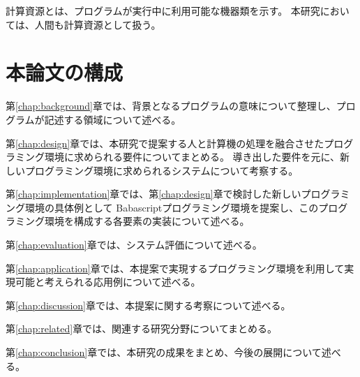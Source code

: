 計算資源とは、プログラムが実行中に利用可能な機器類を示す。
本研究においては、人間も計算資源として扱う。

\section{本論文の構成}\label{ux672cux8ad6ux6587ux306eux69cbux6210}

第\ref{chap:background}章では、背景となるプログラムの意味について整理し、プログラムが記述する領域について述べる。

第\ref{chap:design}章では、本研究で提案する人と計算機の処理を融合させたプログラミング環境に求められる要件についてまとめる。
導き出した要件を元に、新しいプログラミング環境に求められるシステムについて考察する。

第\ref{chap:implementation}章では、第\ref{chap:design}章で検討した新しいプログラミング環境の具体例として
Babascriptプログラミング環境を提案し、このプログラミング環境を構成する各要素の実装について述べる。

第\ref{chap:evaluation}章では、システム評価について述べる。

第\ref{chap:application}章では、本提案で実現するプログラミング環境を利用して実現可能と考えられる応用例について述べる。

第\ref{chap:discussion}章では、本提案に関する考察について述べる。

第\ref{chap:related}章では、関連する研究分野についてまとめる。

第\ref{chap:conclusion}章では、本研究の成果をまとめ、今後の展開について述べる。
